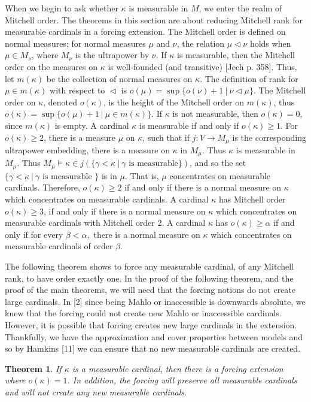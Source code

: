 \documentclass[10pt,leqno]{amsart}
\newtheorem{theorem}{Theorem}[]
\begin{document}
When we begin to ask whether $\kappa$ is measurable in $M$, we enter the realm of Mitchell order. The theorems in this section are about reducing Mitchell rank for measurable cardinals in a forcing extension. The Mitchell order is defined on normal measures; for normal measures $\mu$ and $\nu$, the relation $\mu \vartriangleleft \nu$ holds when $\mu \in M_{\nu}$, where $M_{\nu}$ is the ultrapower by $\nu$. If $\kappa$ is measurable, then the Mitchell order on the measures on $\kappa$ is well-founded (and transitive) [Jech p. 358]. Thus, let $m(\kappa)$ be the collection of normal measures on $\kappa$. The definition of rank for $\mu \in m(\kappa)$ with respect to $\vartriangleleft$ is $o(\mu) = \sup \{o(\nu) + 1 \ | \ \nu \vartriangleleft \mu\}$. The Mitchell order on $\kappa$, denoted $o(\kappa)$, is the height of the Mitchell order on $m(\kappa)$, thus $o(\kappa) = \sup\{o(\mu) + 1 \ | \ \mu \in m(\kappa)\}$. If $\kappa$ is not measurable, then $o(\kappa) = 0$, since $m(\kappa)$ is empty. A cardinal $\kappa$ is measurable if and only if $o(\kappa) \ge 1.$ For $o(\kappa) \ge 2$, there is a measure $\mu$ on $\kappa$, such that if $j:V \to M_{\mu}$ is the corresponding ultrapower embedding, there is a measure on $\kappa$ in $M_{\mu}$. Thus $\kappa$ is measurable in $M_{\mu}$.  Thus $M_{\mu} \models \kappa \in j(\{ \gamma < \kappa \ | \ \gamma \mbox{ is measurable} \} )$, and so the set $\{ \gamma < \kappa \ | \ \gamma \mbox{ is measurable } \}$ is in $\mu$. That is, $\mu$ concentrates on measurable cardinals. Therefore, $o(\kappa) \ge 2$ if and only if there is a normal measure on $\kappa$ which concentrates on measurable cardinals. A cardinal $\kappa$ has Mitchell order $o(\kappa) \ge 3$, if and only if there is a normal measure on $\kappa$ which concentrates on measurable cardinals with Mitchell order 2. A cardinal $\kappa$ has $o(\kappa) \ge \alpha$ if and only if for every $\beta < \alpha,$ there is a normal measure on $\kappa$ which concentrates on measurable cardinals of order $\beta$.

The following theorem shows to force any measurable cardinal, of any Mitchell rank, to have order exactly one. In the proof of the following theorem, and the proof of the main theorems, we will need that the forcing notions do not create large cardinals. In [2] since being Mahlo or inaccessible is downwards absolute, we knew that the forcing could not create new Mahlo or inaccessible cardinals. However, it is possible that forcing creates new large cardinals in the extension. Thankfully, we have the approximation and cover properties between models and so by Hamkins [11] we can ensure that no new measurable cardinals are created. 
\begin{theorem} If $\kappa$ is a measurable cardinal, then there is a forcing extension where $o(\kappa) = 1$. In addition, the forcing will preserve all measurable cardinals and will not create any new measurable cardinals.\\
\end{theorem}
\end{document}
